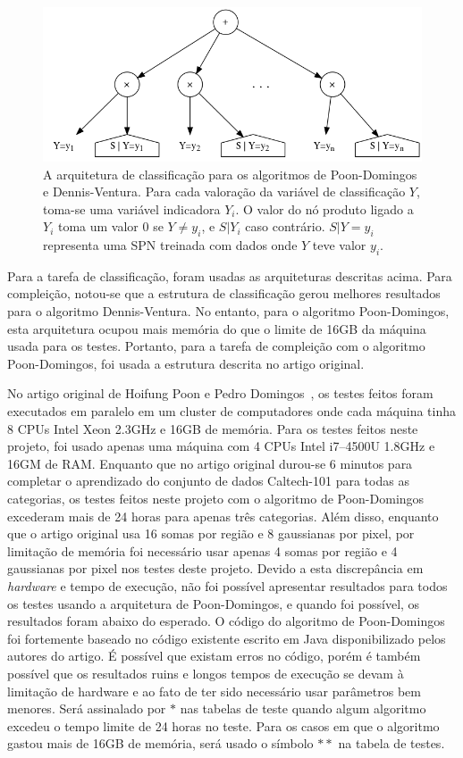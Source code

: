 \documentclass[12pt]{article}
\theoremstyle{plain}
\numberwithin{equation}{section}
\begin{document}
\begin{figure}[h]
  \centering\includegraphics[scale=0.55]{graphs/classarch.png}
  \captionsetup{justification=raggedright}
  \caption{A arquitetura de classificação para os algoritmos de Poon-Domingos e Dennis-Ventura.
    Para cada valoração da variável de classificação $Y$, toma-se uma variável indicadora $Y_i$.
    O valor do nó produto ligado a $Y_i$ toma um valor 0 se $Y\neq y_i$, e $S|Y_i$ caso contrário.
    $S|Y=y_i$ representa uma SPN treinada com dados onde $Y$ teve valor $y_i$.}
\end{figure}

Para a tarefa de classificação, foram usadas as arquiteturas descritas acima. Para compleição,
notou-se que a estrutura de classificação gerou melhores resultados para o algoritmo
Dennis-Ventura. No entanto, para o algoritmo Poon-Domingos, esta arquitetura ocupou mais memória do
que o limite de 16GB da máquina usada para os testes. Portanto, para a tarefa de compleição com o
algoritmo Poon-Domingos, foi usada a estrutura descrita no artigo original.

No artigo original de Hoifung Poon e Pedro Domingos~\cite{poon-domingos}, os testes feitos foram
executados em paralelo em um cluster de computadores onde cada máquina tinha 8 CPUs Intel Xeon
2.3GHz e 16GB de memória. Para os testes feitos neste projeto, foi usado apenas uma máquina com 4
CPUs Intel i7--4500U 1.8GHz e 16GM de RAM\@. Enquanto que no artigo original durou-se 6 minutos
para completar o aprendizado do conjunto de dados Caltech-101 para todas as categorias, os testes
feitos neste projeto com o algoritmo de Poon-Domingos excederam mais de 24 horas para apenas três
categorias.  Além disso, enquanto que o artigo original usa 16 somas por região e 8 gaussianas por
pixel, por limitação de memória foi necessário usar apenas 4 somas por região e 4 gaussianas por
pixel nos testes deste projeto. Devido a esta discrepância em \textit{hardware} e tempo de
execução, não foi possível apresentar resultados para todos os testes usando a arquitetura de
Poon-Domingos, e quando foi possível, os resultados foram abaixo do esperado. O código do algoritmo
de Poon-Domingos foi fortemente baseado no código existente escrito em Java disponibilizado pelos
autores do artigo. É possível que existam erros no código, porém é também possível que os
resultados ruins e longos tempos de execução se devam à limitação de hardware e ao fato de ter sido
necessário usar parâmetros bem menores. Será assinalado por $\ast$ nas tabelas de teste quando
algum algoritmo excedeu o tempo limite de 24 horas no teste.  Para os casos em que o algoritmo
gastou mais de 16GB de memória, será usado o símbolo $\ast\ast$ na tabela de testes.
\end{document}
